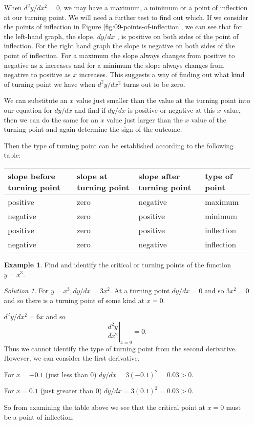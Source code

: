 \documentclass[
  11pt,
  oneside]{book}
\newcommand{\slide}{}
\theoremstyle{definition}
\theoremstyle{definition}
\newtheorem{example}{Example}[chapter]
\theoremstyle{definition}
\theoremstyle{definition}
\theoremstyle{remark}
\newtheorem*{solution}{Solution}
\begin{document}
When \(d^2y/dx^2=0\), we may have a maximum, a minimum or a point of inflection at our turning point. We will need a further test to find out which. If we consider the points of inflection in Figure \ref{fig:09-points-of-inflection}, we can see that for the left-hand graph, the slope, \(dy/dx\) , is positive on both sides of the point of inflection. For the right hand graph the slope is negative on both sides of the point of inflection. For a maximum the slope always changes from positive to negative as x increases and for a minimum the slope always changes from negative to positive as \(x\) increases. This suggests a way of finding out what kind of turning point we have when \(d^2y/dx^2\) turns out to be zero.

We can substitute an \(x\) value just smaller than the value at the turning point into our equation for \(dy/dx\) and find if \(dy/dx\) is positive or negative at this \(x\) value, then we can do the same for an \(x\) value just larger than the \(x\) value of the turning point and again determine the sign of the outcome.
\slide

Then the type of turning point can be established according to the following table:

\begin{tabular}{l|l|l|l}
\hline
slope before turning point & slope at turning point & slope after turning point & type of point\\
\hline
positive & zero & negative & maximum\\
\hline
negative & zero & positive & minimum\\
\hline
positive & zero & positive & inflection\\
\hline
negative & zero & negative & inflection\\
\hline
\end{tabular}
\slide

\begin{example}
Find and identify the critical or turning points of the function \(y=x^3\).
\end{example}

\begin{solution}
For \(y=x^3, dy/dx = 3x^2\). At a turning point \(dy/dx=0\) and so \(3x^2=0\) and so there is a turning point of some kind at \(x=0\).

\(d^2y/dx^2=6x\) and so
\[
\left.\frac{d^2y}{dx^2}\right\vert_{x=0} = 0.
\]
Thus we cannot identify the type of turning point from the second derivative.
However, we can consider the first derivative.

For \(x=-0.1\) (just less than \(0\)) \(dy/dx = 3(-0.1)^2 = 0.03>0\).

For \(x = 0.1\) (just greater than \(0\)) \(dy/dx=3(0.1)^2 = 0.03>0\).

So from examining the table above we see that the critical point at \(x=0\) must be a point of inflection.
\end{solution}
\end{document}
